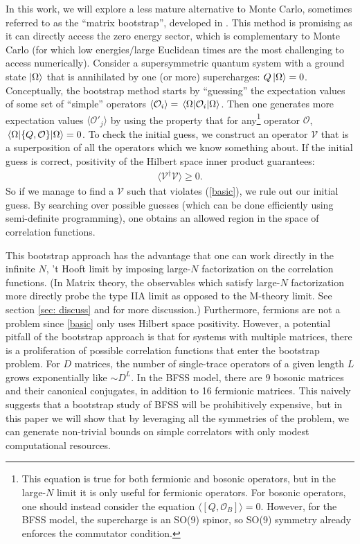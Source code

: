 \documentclass[11pt]{article}
\def\nref#1{(\ref{#1})}
\renewcommand{\ev}[1]{\langle #1 \rangle} %
\begin{document}
In this work, we will explore a less mature alternative to Monte Carlo, sometimes referred to as the ``matrix bootstrap'', developed in \cite{Anderson:2016rcw,Lin:2020mme,Han:2020bkb,Kazakov:2021lel,Kazakov:2022xuh, Cho:2022lcj,Lin:2023owt, Kazakov:2024ool, Li:2024wrd}. This method is promising as it can directly access the zero energy sector, which is complementary to Monte Carlo (for which low energies/large Euclidean times are the most challenging to access numerically).
Consider a supersymmetric quantum system with a ground state $\ket{\Omega}$ that is annihilated by one (or more) supercharges: $Q \ket{\Omega} = 0$.  Conceptually, the bootstrap method starts by ``guessing'' the expectation values of some set of ``simple'' operators $\ev{\mathcal{O}_i} = \mel{\Omega}{\mathcal{O}_i}{\Omega}$. Then one generates more expectation values $\ev{\mathcal{O}'_j}$ by using the property that for any\footnote{This equation is true for both fermionic and bosonic operators, but in the large-$N$ limit it is only useful for fermionic operators. For bosonic operators, one should instead consider the equation $\ev{ [Q, \mathcal{O}_B] } = 0$. However, for the BFSS model, the supercharge is an SO(9) spinor, so SO(9) symmetry already enforces the commutator condition. } operator $\mathcal{O}$, $\mel{\Omega}{ \{ Q, \mathcal{O}\}  }{\Omega}  = 0$.
To check the initial guess, we construct an operator $\mathcal{V}$ that is a superposition of all the operators which we know something about. If the initial guess is correct, positivity of the Hilbert space inner product guarantees:
\begin{align}
\label{basic}
\langle \mathcal{V}^\dagger \mathcal{V} \rangle \ge 0.
\end{align}
So if we manage to find a $\mathcal{V}$ such that violates \nref{basic}, we rule out our initial guess. By searching over possible guesses (which can be done efficiently using semi-definite programming), one obtains an allowed region in the space of correlation functions. 

This bootstrap approach has the advantage that one can work directly in the infinite $N$, 't Hooft limit by imposing large-$N$ factorization on the correlation functions.
(In Matrix theory, the observables which satisfy large-$N$ factorization more directly probe the type IIA limit \cite{Itzhaki:1998dd} as opposed to the M-theory limit. See section \ref{sec: discuss} and \cite{Polchinski:1999br} for more discussion.) Furthermore, fermions are not a problem since \eqref{basic} only uses Hilbert space positivity. However, a potential pitfall of the bootstrap approach is that for systems with multiple matrices, there is a proliferation of possible correlation functions that enter the bootstrap problem. For $D$ matrices, the number of single-trace operators of a given length $L$ grows exponentially like $\sim D^L$. In the BFSS model, there are $9$ bosonic matrices and their canonical conjugates, in addition to 16 fermionic matrices. This naively suggests that a bootstrap study of BFSS will be prohibitively expensive, but in this paper we will show that by leveraging all the symmetries of the problem, we can generate non-trivial bounds on simple correlators with only modest computational resources. 
\end{document}
